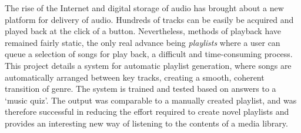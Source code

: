 The rise of the Internet and digital storage of audio has brought about a new platform for delivery of audio. Hundreds of tracks can be easily be acquired and played back at the click of a button. Nevertheless, methods of playback have remained fairly static, the only real advance being \emph{playlists} where a user can queue a selection of songs for play back, a difficult and time-consuming process. This project details a system for automatic playlist generation, where songs are automatically arranged between key tracks, creating a smooth, coherent transition of genre. The system is trained and tested based on answers to a `music quiz'. The output was comparable to a manually created playlist, and was therefore successful in reducing the effort required to create novel playlists and provides an interesting new way of listening to the contents of a media library.
